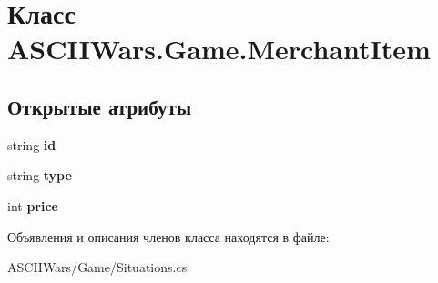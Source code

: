 \hypertarget{class_a_s_c_i_i_wars_1_1_game_1_1_merchant_item}{}\section{Класс A\+S\+C\+I\+I\+Wars.\+Game.\+Merchant\+Item}
\label{class_a_s_c_i_i_wars_1_1_game_1_1_merchant_item}
\subsection*{Открытые атрибуты}
\begin{DoxyCompactItemize}
\item 
\hypertarget{class_a_s_c_i_i_wars_1_1_game_1_1_merchant_item_a43704fae44c4c55cb243bb6922558e12}{}\label{class_a_s_c_i_i_wars_1_1_game_1_1_merchant_item_a43704fae44c4c55cb243bb6922558e12} 
string {\bfseries id}
\item 
\hypertarget{class_a_s_c_i_i_wars_1_1_game_1_1_merchant_item_a0621b09ff9dc3029f660e32b90db815c}{}\label{class_a_s_c_i_i_wars_1_1_game_1_1_merchant_item_a0621b09ff9dc3029f660e32b90db815c} 
string {\bfseries type}
\item 
\hypertarget{class_a_s_c_i_i_wars_1_1_game_1_1_merchant_item_af1b4ca7cc021067017ece68cc0145631}{}\label{class_a_s_c_i_i_wars_1_1_game_1_1_merchant_item_af1b4ca7cc021067017ece68cc0145631} 
int {\bfseries price}
\end{DoxyCompactItemize}


Объявления и описания членов класса находятся в файле\+:\begin{DoxyCompactItemize}
\item 
A\+S\+C\+I\+I\+Wars/\+Game/Situations.\+cs\end{DoxyCompactItemize}
